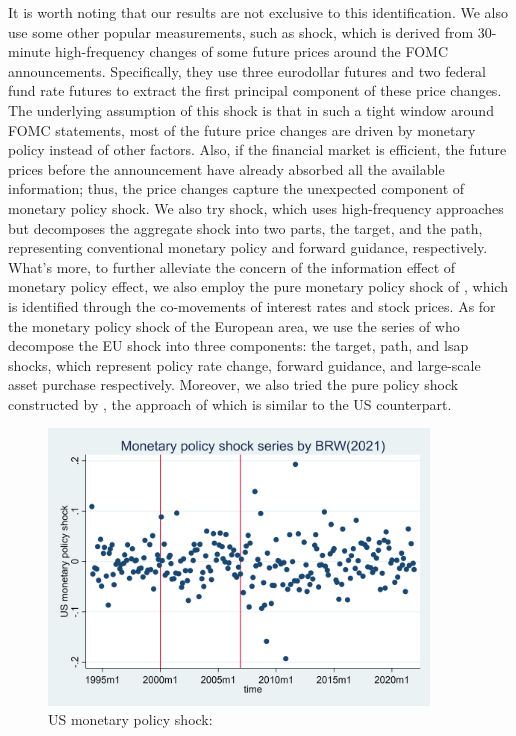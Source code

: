 It is worth noting that our results are not exclusive to this identification. We also use some other popular measurements, such as \cite{nakamura2018high} shock, which is derived from 30-minute high-frequency changes of some future prices around the FOMC announcements. Specifically, they use three eurodollar futures and two federal fund rate futures to extract the first principal component of these price changes. The underlying assumption of this shock is that in such a tight window around FOMC statements, most of the future price changes are driven by monetary policy instead of other factors. Also, if the financial market is efficient, the future prices before the announcement have already absorbed all the available information; thus, the price changes capture the unexpected component of monetary policy shock. We also try \cite{guraynak2005actions} shock, which uses high-frequency approaches but decomposes the aggregate shock into two parts, the target, and the path, representing conventional monetary policy and forward guidance, respectively. What's more, to further alleviate the concern of the information effect of monetary policy effect, we also employ the pure monetary policy shock of \cite{jarocinski2020deconstructing}, which is identified through the co-movements of interest rates and stock prices. As for the monetary policy shock of the European area, we use the series of \cite{miranda2022tale} who decompose the EU shock into three components: the target, path, and lsap shocks, which represent policy rate change, forward guidance, and large-scale asset purchase respectively. Moreover, we also tried the pure policy shock constructed by \cite{jarocinski2020deconstructing}, the approach of which is similar to the US counterpart.

\begin{figure}[H]
    \centering
    \includegraphics[width=0.9\textwidth]{latex/drafts/pic/BRW.png}
    \caption{\small US monetary policy shock: \cite{bu2021unified}}
    \label{fig: BRW}
\end{figure}

